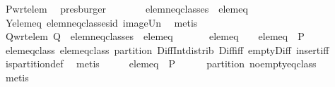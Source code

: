 \begin{isabellebody}
\ P{\isacharunderscore}wrt{\isacharunderscore}elem\ \isamarkupfalse%
\ presburger\isanewline
\ \ \isamarkupfalse%
\ \isamarkupfalse%
\ {\isachardoublequoteopen}{\isasymdots}\ {\isacharequal}\ {\isacharquery}elem{\isacharunderscore}neq{\isacharunderscore}classes\ {\isasymunion}\ {\isacharbraceleft}{\isacharquery}elem{\isacharunderscore}eq{\isacharbraceright}\ {\isacharminus}\ {\isacharbraceleft}{\isacharbraceleft}{\isacharbraceright}{\isacharbraceright}{\isachardoublequoteclose}\isanewline
\ \ \ \ \isamarkupfalse%
\ Y{\isacharunderscore}elem{\isacharunderscore}eq\ elem{\isacharunderscore}neq{\isacharunderscore}classes{\isacharunderscore}id\ image{\isacharunderscore}Un\ \isamarkupfalse%
\ metis\isanewline
\ \ \isamarkupfalse%
\ \isamarkupfalse%
\ Q{\isacharunderscore}wrt{\isacharunderscore}elem{\isacharcolon}\ {\isachardoublequoteopen}{\isacharquery}Q\ {\isacharequal}\ {\isacharquery}elem{\isacharunderscore}neq{\isacharunderscore}classes\ {\isasymunion}\ {\isacharbraceleft}{\isacharquery}elem{\isacharunderscore}eq{\isacharbraceright}\ {\isacharminus}\ {\isacharbraceleft}{\isacharbraceleft}{\isacharbraceright}{\isacharbraceright}{\isachardoublequoteclose}\ \isacommand{{\isachardot}}\isamarkupfalse%
\isanewline
\isanewline
\ \ \isamarkupfalse%
\ {\isachardoublequoteopen}{\isacharquery}elem{\isacharunderscore}eq\ {\isacharequal}\ {\isacharbraceleft}{\isacharbraceright}\ {\isasymor}\ {\isacharquery}elem{\isacharunderscore}eq\ {\isasymnotin}\ P{\isachardoublequoteclose}\isanewline
\ \ \ \ \isamarkupfalse%
\ elem{\isacharunderscore}eq{\isacharunderscore}class\ elem{\isacharunderscore}eq{\isacharunderscore}class{\isacharprime}\ partition\ Diff{\isacharunderscore}Int{\isacharunderscore}distrib{}\ Diff{\isacharunderscore}iff\ empty{\isacharunderscore}Diff\ insert{\isacharunderscore}iff\isanewline
{}\isamarkupfalse%
\ is{\isacharunderscore}partition{\isacharunderscore}def\ \isamarkupfalse%
\ metis\isanewline
\ \ \isamarkupfalse%
\ \isamarkupfalse%
\ {\isachardoublequoteopen}{\isacharquery}elem{\isacharunderscore}eq\ {\isasymnotin}\ P{\isachardoublequoteclose}\isanewline
\ \ \ \ \isamarkupfalse%
\ partition\ no{\isacharunderscore}empty{\isacharunderscore}eq{\isacharunderscore}class\isanewline
\ \ \ \ \isamarkupfalse%
\ metis\isanewline
\ \ \isamarkupfalse%
\ \isamarkupfalse%

\end{isabellebody}
